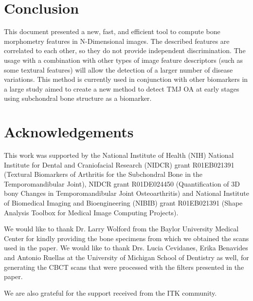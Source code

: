 \documentclass{InsightArticle}
\begin{document}
\newpage
\section{Conclusion}
\label{sec:conclusions}

This document presented a new, fast, and efficient tool to compute bone morphometry features in N-Dimensional images. The described features are correlated to each other, so they do not provide independent discrimination. The usage with a combination with other types of image feature descriptors (such as some textural features\cite{textureFeat1}) will allow the detection of a larger number of disease variations. This method is currently used in conjunction with other biomarkers in a large study aimed to create a new method to detect TMJ OA at early stages using subchondral bone structure as a biomarker.

\section*{Acknowledgements}

This work was supported by the National Institute of Health (NIH) National Institute for Dental and Craniofacial Research (NIDCR) grant R01EB021391 (Textural Biomarkers of Arthritis for the Subchondral Bone in the Temporomandibular Joint), NIDCR grant R01DE024450  (Quantification of 3D bony Changes in Temporomandibular Joint Osteoarthritis) and National Institute of Biomedical Imaging and Bioengineering (NIBIB) grant R01EB021391 (Shape Analysis Toolbox for Medical Image Computing Projects).

We would like to thank Dr. Larry Wolford from the Baylor University Medical Center for kindly providing the bone specimens from which we obtained the scans used in the paper. We would like to thank Drs. Lucia Cevidanes, Erika Benavides and Antonio Ruellas at the University of Michigan School of Dentistry as well, for generating the CBCT scans that were processed with the filters presented in the paper.

We are also grateful for the support received from the ITK community.

%
%


\end{document}
